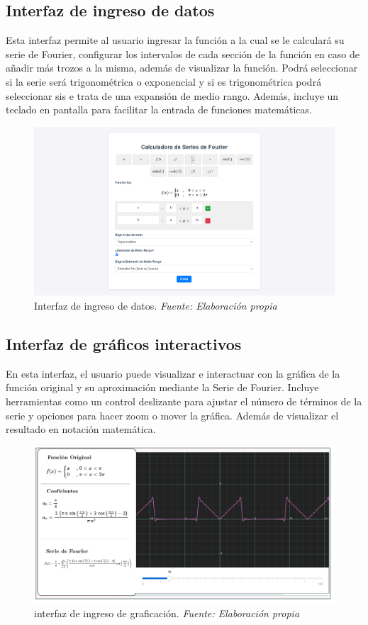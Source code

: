 \subsection{Interfaz de ingreso de datos}
Esta interfaz permite al usuario ingresar la función a la cual se le calculará su serie de Fourier, configurar los intervalos de cada sección de la función en caso de añadir más trozos a la misma, además de visualizar la función. Podrá seleccionar si la serie será trigonométrica o exponencial y si es trigonométrica podrá seleccionar sis e trata de una expansión de medio rango.  Además, incluye un teclado en pantalla para facilitar la entrada de funciones matemáticas.
\begin{figure}[H]
	\centering
	\includegraphics[width=1\textwidth]{img/chapter04/mockup_datos.png}
	\caption[Interfaz de ingreso de datos.]{Interfaz de ingreso de datos. \textit{Fuente: \textit{Elaboración propia}}}
	\label{fig:mockup_datos}
\end{figure}

\subsection{Interfaz de gráficos interactivos}
En esta interfaz, el usuario puede visualizar e interactuar con la gráfica de la función original y su aproximación mediante la Serie de Fourier. Incluye herramientas como un control deslizante para ajustar el número de términos de la serie y opciones para hacer zoom o mover la gráfica. Además de visualizar el resultado en notación matemática.
\begin{figure}[H]
	\centering
	\includegraphics[width=1\textwidth]{img/chapter04/mockup_grafica.png}
	\caption[Interfaz de ingreso de graficación.]{interfaz de ingreso de graficación. \textit{Fuente: \textit{Elaboración propia}}}
	\label{fig:mockup_grafica}
\end{figure}

